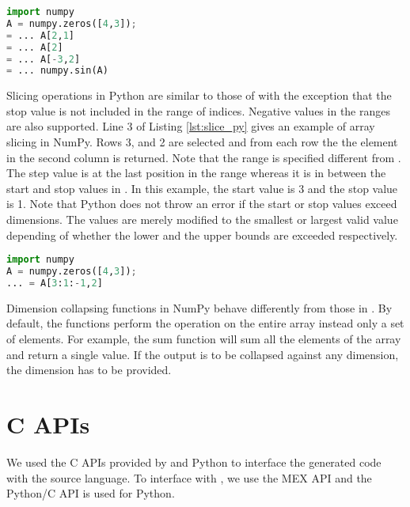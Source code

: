 \begin{lstlisting}[float, language=python, label={lst:index_py}, caption={An example of indexing in NumPy}]
import numpy
A = numpy.zeros([4,3]);
= ... A[2,1]
= ... A[2]
= ... A[-3,2]
= ... numpy.sin(A)
\end{lstlisting}

Slicing operations in Python are similar to those of \matlab with the exception that the stop value is not included in the range of indices. Negative values in the ranges are also supported. Line 3 of Listing \ref{lst:slice_py} gives an example of array slicing in NumPy. Rows 3, and 2 are selected and from each row the the element in the second column is returned. Note that the range is specified different from \matlab. The step value is at the last position in the range whereas it is in between the start and stop values in \matlab. In this example, the start value is 3 and the stop value is 1. Note that Python does not throw an error if the start or stop values exceed dimensions. The values are merely modified to the smallest or largest valid value depending of whether the lower and the upper bounds are exceeded respectively. 
\begin{lstlisting}[float,language=python, label={lst:slice_py}, caption={An example of array slicing in NumPy}]
import numpy
A = numpy.zeros([4,3]);
... = A[3:1:-1,2]
\end{lstlisting}

Dimension collapsing functions in NumPy behave differently from those in \matlab. By default, the functions perform the operation on the entire array instead only a set of elements. For example, the \textsf{sum} function will sum all the elements of the array and return a single value. If the output is to be collapsed against any dimension, the dimension has to be provided. 

\section{C APIs}
We used the C APIs provided by \matlab and Python to interface the generated code with the source language. To interface with \matlab, we use the MEX\cite{mex} API and the Python/C\cite{pyc} API is used for Python. 

